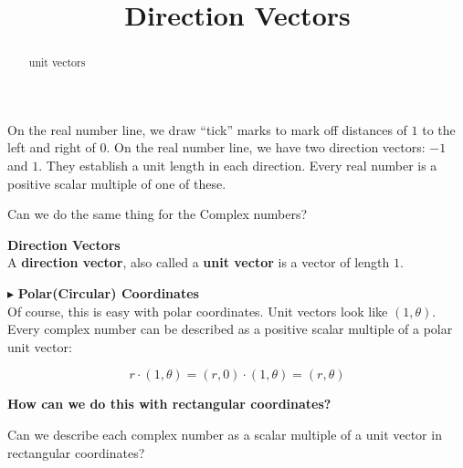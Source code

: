 \documentclass{ximera}
\title{Direction Vectors}
\begin{document}
\begin{abstract}
unit vectors
\end{abstract}
\maketitle




On the real number line, we draw ``tick'' marks to mark off distances of $1$ to the left and right of $0$. On the real number line, we have two direction vectors: $-1$ and $1$.  They establish a unit length in each direction. Every real number is a positive scalar multiple of one of these.

Can we do the same thing for the Complex numbers? \\









\begin{definition}  \textbf{\textcolor{green!50!black}{Direction Vectors}}   \\

A \textbf{direction vector}, also called a \textbf{unit vector} is a vector of length $1$.

\end{definition}









$\blacktriangleright$ \textbf{\textcolor{blue!75!black}{Polar(Circular) Coordinates}}  \\


Of course, this is easy with polar coordinates.  Unit vectors look like $(1, \theta)$. \\

Every complex number can be described as a positive scalar multiple of a polar unit vector:  


\[
r \cdot (1, \theta) = (r, 0) \cdot (1, \theta) = (r, \theta)
\]



\begin{center}
\textbf{\textcolor{red!80!black}{How can we do this with rectangular coordinates?}}
\end{center}



Can we describe each complex number as a scalar multiple of a unit vector in rectangular coordinates? \\
\end{document}
